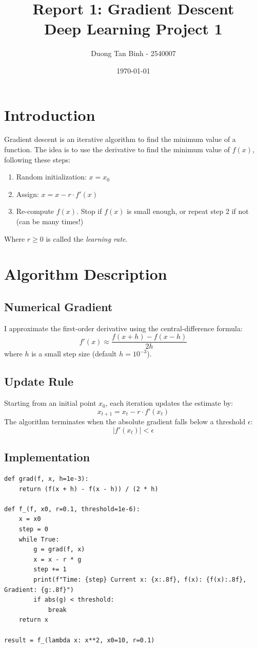 \documentclass[12pt,a4paper]{article}
\title{\textbf{Report 1: Gradient Descent} \\ \large Deep Learning Project 1}
\author{Duong Tan Binh - 2540007}
\date{\today}
\begin{document}
\maketitle
\tableofcontents
\newpage

\section{Introduction}

Gradient descent is an iterative algorithm to find the minimum value of a function. The idea is to use the derivative to find the minimum value of $f(x)$, following these steps:
\begin{enumerate}
    \item Random initialization: $x = x_0$
    \item Assign: $x = x - r \cdot f'(x)$
    \item Re-compute $f(x)$. Stop if $f(x)$ is small enough, or repeat step 2 if not (can be many times!)
\end{enumerate}
Where $r \geq 0$ is called the \textit{learning rate}.

\section{Algorithm Description}

\subsection{Numerical Gradient}

I approximate the first-order derivative using the central-difference formula:
\[
    f'(x) \approx \frac{f(x + h) - f(x - h)}{2h}
\]
where $h$ is a small step size (default $h = 10^{-3}$).

\subsection{Update Rule}

Starting from an initial point $x_0$, each iteration updates the estimate by:
\[
    x_{t+1} = x_t - r \cdot f'(x_t)
\]
The algorithm terminates when the absolute gradient falls below a threshold $\epsilon$:
\[
    |f'(x_t)| < \epsilon
\]

\subsection{Implementation}

\begin{lstlisting}[caption={Gradient Descent Implementation}]
def grad(f, x, h=1e-3):
    return (f(x + h) - f(x - h)) / (2 * h)

def f_(f, x0, r=0.1, threshold=1e-6):
    x = x0
    step = 0
    while True:
        g = grad(f, x)
        x = x - r * g
        step += 1
        print(f"Time: {step} Current x: {x:.8f}, f(x): {f(x):.8f}, Gradient: {g:.8f}")
        if abs(g) < threshold:
            break
    return x

result = f_(lambda x: x**2, x0=10, r=0.1)
\end{lstlisting}
\end{document}

